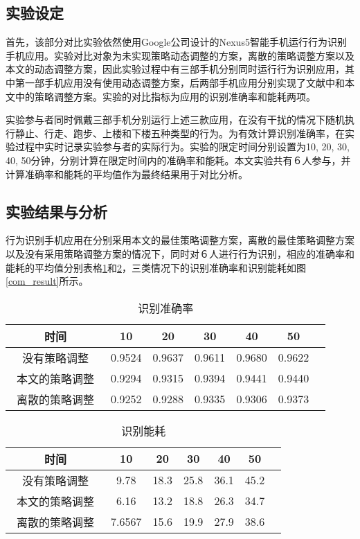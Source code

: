 \subsection{实验设定}
\par 首先，该部分对比实验依然使用Google公司设计的Nexus5智能手机运行行为识别手机应用。实验对比对象为未实现策略动态调整的方案，离散的策略调整方案以及本文的动态调整方案，因此实验过程中有三部手机分别同时运行行为识别应用，其中第一部手机应用没有使用动态调整方案，后两部手机应用分别实现了文献\cite{}中和本文中的策略调整方案。实验的对比指标为应用的识别准确率和能耗两项。
\par 实验参与者同时佩戴三部手机分别运行上述三款应用，在没有干扰的情况下随机执行静止、行走、跑步、上楼和下楼五种类型的行为。为有效计算识别准确率，在实验过程中实时记录实验参与者的实际行为。实验的限定时间分别设置为10, 20, 30, 40, 50分钟，分别计算在限定时间内的准确率和能耗。本文实验共有６人参与，并计算准确率和能耗的平均值作为最终结果用于对比分析。
\subsection{实验结果与分析}
\par 行为识别手机应用在分别采用本文的最佳策略调整方案，离散的最佳策略调整方案\cite{modelVarialb}以及没有采用策略调整方案的情况下，同时对６人进行行为识别，相应的准确率和能耗的平均值分别表格\ref{final_precision}和\ref{final_energy}，三类情况下的识别准确率和识别能耗如图\ref{com_result}所示。

\begin{table}[htb]
    \centering
    \caption{识别准确率}\label{final_precision}
    \begin{tabular}{ccccccc}
    \toprule
    时间 & 10 & 20 & 30 & 40 & 50 \\
    \midrule
    没有策略调整 & 0.9524 & 0.9637 & 0.9611 & 0.9680 & 0.9622 \\
    本文的策略调整　& 0.9294 & 0.9315 & 0.9394 & 0.9441 & 0.9440 \\
    离散的策略调整 & 0.9252 & 0.9288 & 0.9335 & 0.9306 & 0.9373 \\
    \bottomrule
    \end{tabular}
\end{table}

\begin{table}[htb]
    \centering
    \caption{识别能耗}\label{final_energy}
    \begin{tabular}{ccccccc}
    \toprule
    时间 & 10 & 20 & 30 & 40 & 50 \\
    \midrule
    没有策略调整 & 9.78 & 18.3 & 25.8 & 36.1 & 45.2 \\
    本文的策略调整　& 6.16 & 13.2 & 18.8 & 26.3 & 34.7 \\
    离散的策略调整 & 7.6567 & 15.6 & 19.9 & 27.9 & 38.6 \\
    \bottomrule
    \end{tabular}
\end{table}

